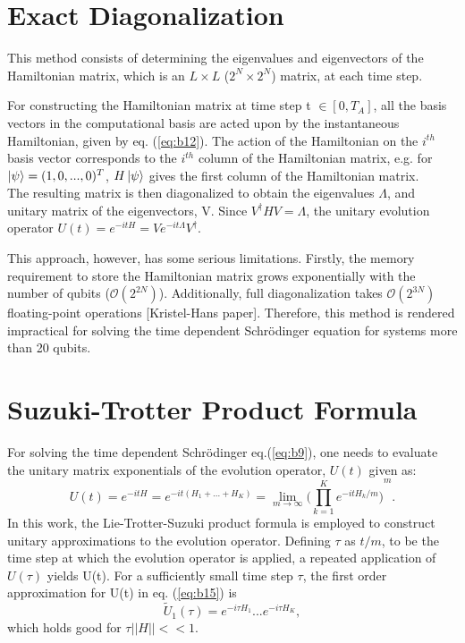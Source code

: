 \documentclass[../main.tex]{subfiles}
\begin{document}
\section{Exact Diagonalization}
This method consists of determining the eigenvalues and eigenvectors of the Hamiltonian matrix, which is an $L\times L$ ($2^N \times 2^N$) matrix, at each time step.

For constructing the Hamiltonian matrix at time step t $\in [0,T_A]$, all the basis vectors in the computational basis are acted upon by the instantaneous Hamiltonian, given by eq. (\ref{eq:b12}). The action of the Hamiltonian on the $i^{th}$ basis vector corresponds to the $i^{th}$ column of the Hamiltonian matrix, e.g. for $\ket{\psi}=(1,0,...,0)^T$, $H\ket{\psi}$ gives the first column of the Hamiltonian matrix. \\
The resulting matrix is then diagonalized to obtain the eigenvalues $\Lambda$, and unitary matrix of the eigenvectors, V. Since $V^{\dagger}HV=\Lambda$, the unitary evolution operator $U(t)=e^{-itH}=Ve^{-it\Lambda}V^{\dagger}$.


This approach, however, has some serious limitations. Firstly, the memory requirement to store the Hamiltonian matrix grows exponentially with the number of qubits ($\mathcal{O}(2^{2N})$). Additionally, full diagonalization takes $\mathcal{O}(2^{3N})$ floating-point operations [Kristel-Hans paper]. Therefore, this method is rendered impractical for solving the time dependent Schr{\"o}dinger equation for systems more than 20 qubits.

\section{Suzuki-Trotter Product Formula} 
For solving the time dependent Schr{\"o}dinger eq.(\ref{eq:b9}), one needs to evaluate the  unitary matrix exponentials of the evolution operator, $U(t)$ given as:
\begin{equation}
U(t)= e^{-itH}= e^{-it(H_1+...+H_K)}= \lim\limits_{m \to \infty} {\bigg(\prod_{k=1}^{K}e^{-itH_k/m} \bigg)}^m.    \label{eq:b15}
\end{equation}
In this work, the Lie-Trotter-Suzuki product formula is employed to construct unitary approximations to the evolution operator. Defining $\tau$ as $t/m$, to be the time step at which the evolution operator is applied, a repeated application of $U(\tau)$ yields U(t). For a sufficiently small time step $\tau$, the first order approximation for U(t) in eq. (\ref{eq:b15}) is
\begin{equation}
\tilde{U}_1(\tau)=e^{-i\tau H_1}...e^{-i\tau H_K},    \label{eq:b16}
\end{equation}
which holds good for $\tau \left| \left| H \right| \right| << 1$.
\end{document}
